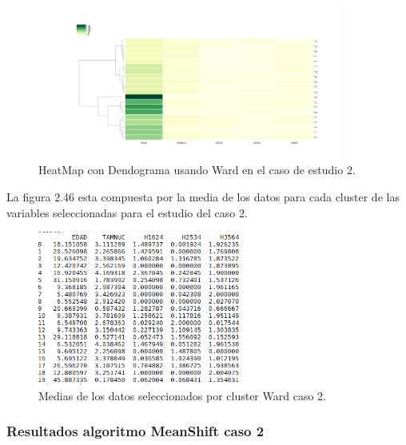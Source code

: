 	\begin{figure}[htb]
		\centering
		\includegraphics[width=0.9\textwidth]{./imagenes/caso2/heatmapcondendograma_caso2_Ward}
		\caption{HeatMap con Dendograma usando Ward en el caso de estudio 2.} \label{fig:1}
	\end{figure}

	La figura 2.46 esta compuesta por la media de los datos para cada cluster de las variables seleccionadas
	para el estudio del caso 2. \\ 

	\begin{figure}[htb]
		\centering
		\includegraphics[width=0.6\textwidth]{./imagenes/caso2/medias_datos_caso2_Ward}
		\caption{Medias de los datos seleccionados por cluster Ward caso 2.} \label{fig:1}
	\end{figure}


	\subsubsection{Resultados algoritmo MeanShift caso 2}


